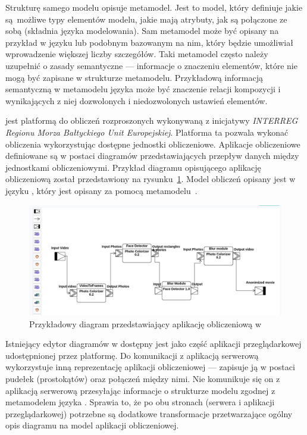 Strukturę samego modelu opisuje metamodel. Jest to model, który definiuje jakie
są~możliwe typy elementów modelu, jakie mają atrybuty, jak są połączone ze
sobą (składnia języka modelowania). Sam metamodel może być opisany na przykład
w języku  lub podobnym
bazowanym na nim, który będzie umożliwiał wprowadzenie większej liczby
szczegółów. Taki metamodel często należy uzupełnić o zasady semantyczne ---
informacje o znaczeniu elementów, które nie mogą być zapisane w strukturze
metamodelu.
Przykładową informacją semantyczną w metamodelu języka  może być
znaczenie relacji kompozycji i wynikających z niej dozwolonych i niedozwolonych
ustawień elementów.

\BalticLSC{} jest platformą do obliczeń rozproszonych wykonywaną z
inicjatywy
\emph{INTERREG Regionu Morza Bałtyckiego Unit Europejskiej}. Platforma ta
pozwala
wykonać obliczenia wykorzystując dostępne jednostki obliczeniowe. Aplikacje
obliczeniowe definiowane są w postaci diagramów przedstawiających przepływ
danych między jednostkami obliczeniowymi. Przykład diagramu opisującego
aplikację
obliczeniową został przedstawiony na
rysunku~\ref{rys:przykladowy-diagram-balticlsc}.  Model obliczeń opisany jest w
języku , który jest opisany za pomocą
metamodelu~\cite{cal-metamodel}.

\begin{figure}[!hb]
	\centering

	\includegraphics[width=0.77\linewidth]{./images/balticlsc-example-diagram.png}
	\caption{Przykładowy diagram przedstawiający aplikację obliczeniową w
		\BalticLSC{}}\label{rys:przykladowy-diagram-balticlsc}
\end{figure}

Istniejący edytor diagramów w \BalticLSC{} dostępny jest jako część aplikacji
przeglądarkowej udostępnionej przez platformę. Do komunikacji z aplikacją
serwerową wykorzystuje inną reprezentację aplikacji obliczeniowej --- zapisuje
ją w postaci pudełek (prostokątów) oraz połączeń między nimi. Nie komunikuje
się on z aplikacją serwerową przesyłając informacje o strukturze modelu
zgodnej z metamodelem języka \CAL{}. Sprawia to, że po obu stronach (serwera
i aplikacji przeglądarkowej) potrzebne są dodatkowe transformacje
przetwarzające ogólny opis diagramu na model aplikacji obliczeniowej.

